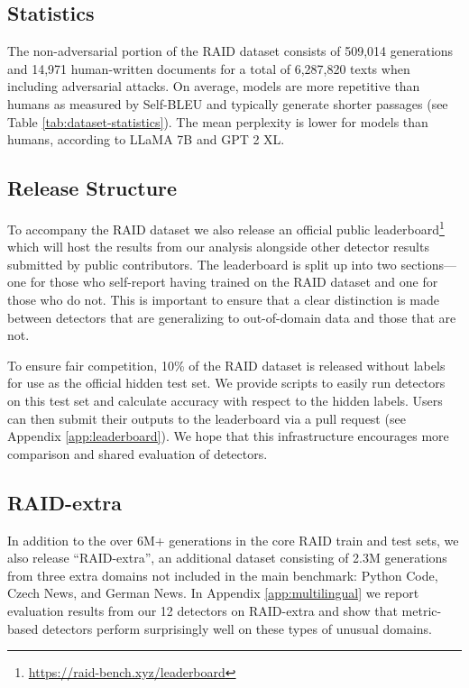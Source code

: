 \documentclass[11pt]{article}
\begin{document}
\subsection{Statistics}
The non-adversarial portion of the RAID dataset consists of 509,014 generations and 14,971 human-written documents for a total of 6,287,820 texts when including adversarial attacks. On average, models are more repetitive than humans as measured by Self-BLEU \cite{zhu2018texygen} and typically generate shorter passages (see Table \ref{tab:dataset-statistics}). The mean perplexity is lower for models than humans, according to LLaMA 7B and GPT 2 XL.%

\subsection{Release Structure}
\label{sec:release_structure}
To accompany the RAID dataset we also release an official public leaderboard\footnote{\url{https://raid-bench.xyz/leaderboard}} which will host the results from our analysis alongside other detector results submitted by public contributors. The leaderboard is split up into two sections---one for those who self-report having trained on the RAID dataset and one for those who do not. This is important to ensure that a clear distinction is made between detectors that are generalizing to out-of-domain data and those that are not. 

To ensure fair competition, 10\% of the RAID dataset is released without labels for use as the official hidden test set. We provide scripts to easily run detectors on this test set and calculate accuracy with respect to the hidden labels. Users can then submit their outputs to the leaderboard via a pull request (see Appendix \ref{app:leaderboard}). We hope that this infrastructure encourages more comparison and shared evaluation of detectors.

\subsection{RAID-extra}
In addition to the over 6M+ generations in the core RAID train and test sets, we also release ``RAID-extra'', an additional dataset consisting of 2.3M generations from three extra domains not included in the main benchmark: Python Code, Czech News, and German News. In Appendix \ref{app:multilingual} we report evaluation results from our 12 detectors on RAID-extra and show that metric-based detectors perform surprisingly well on these types of unusual domains. 
\end{document}
